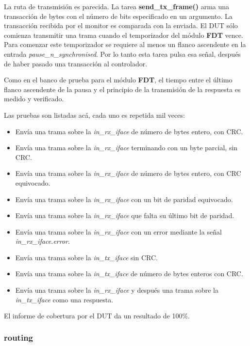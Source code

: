 \documentclass[a4paper, twoside, 11pt]{report}
\begin{document}
La ruta de transmisión es parecida. La tarea \textbf{send\_tx\_frame()} arma una transacción de bytes con el número de bits especificado en un argumento. La transacción recibida por el monitor es comparada con la enviada. El DUT sólo comienza transmitir una trama cuando el temporizador del módulo \textbf{FDT} vence. Para comenzar este temporizador se requiere al menos un flanco ascendente en la entrada \textit{pause\_n\_synchronised}. Por lo tanto esta tarea pulsa esa señal, después de haber pasado una transacción al controlador.

Como en el banco de prueba para el módulo \textbf{FDT}, el tiempo entre el último flanco ascendente de la pausa y el principio de la transmisión de la respuesta es medido y verificado.

Las pruebas son listadas acá, cada uno es repetida mil veces:

\begin{itemize}
  \item Envía una trama sobre la \textit{in\_rx\_iface} de número de bytes entero, con CRC.
  \item Envía una trama sobre la \textit{in\_rx\_iface} terminando con un byte parcial, sin CRC.
  \item Envía una trama sobre la \textit{in\_rx\_iface} de número de bytes entero, con CRC equivocado.
  \item Envía una trama sobre la \textit{in\_rx\_iface} con un bit de paridad equivocado.
  \item Envía una trama sobre la \textit{in\_rx\_iface} que falta su último bit de paridad.
  \item Envía una trama sobre la \textit{in\_rx\_iface} con un error mediante la señal \textit{in\_rx\_iface.error}.
  \item Envía una trama sobre la \textit{in\_tx\_iface} sin CRC.
  \item Envía una trama sobre la \textit{in\_tx\_iface} de número de bytes enteros con CRC.
  \item Envía una trama sobre la \textit{in\_rx\_iface} y después una trama sobre la \textit{in\_tx\_iface} como una respuesta.
\end{itemize}

El informe de cobertura por el DUT da un resultado de 100\%.

\FloatBarrier
\subsubsection{routing}
\end{document}
